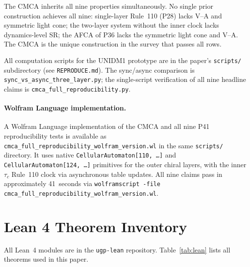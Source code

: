 \documentclass[11pt]{article}
\theoremstyle{remark}
\newcommand{\lean}[1]{%
  \penalty-100
  \begingroup\def\_{\textunderscore\allowbreak}\texttt{#1}\endgroup}
\begin{document}
\begin{appendices}
The CMCA inherits all nine properties simultaneously.  No single prior
construction achieves all nine: single-layer Rule~110 (P28) lacks V--A and
symmetric light cone; the two-layer system without the inner clock lacks
dynamics-level SR; the AFCA of P36 lacks the symmetric light cone and V--A.
The CMCA is the unique construction in the survey that passes all rows.

All computation scripts for the UNIDM1 prototype are in the paper's
\texttt{scripts/} subdirectory (see \texttt{REPRODUCE.md}).
The sync/async comparison is \texttt{sync\_vs\_async\_three\_layer.py};
the single-script verification of all nine headline claims is
\texttt{cmca\_full\_reproducibility.py}.

\paragraph{Wolfram Language implementation.}
A Wolfram Language implementation of the CMCA and all nine P41 reproducibility
tests is available as \texttt{cmca\_full\_reproducibility\_wolfram\_version.wl} in the same \texttt{scripts/}
directory.  It uses native \texttt{CellularAutomaton[110,~\ldots]} and
\texttt{CellularAutomaton[124,~\ldots]} primitives for the outer chiral layers,
with the inner $\tau_c$ Rule~110 clock via asynchronous table updates.
All nine claims pass in approximately 41~seconds via
\texttt{wolframscript -file cmca\_full\_reproducibility\_wolfram\_version.wl}.

\section{Lean 4 Theorem Inventory}
\label{app:lean}

All Lean~4 modules are in the \lean{ugp-lean} repository.
Table~\ref{tab:lean} lists all theorems used in this paper.


\end{appendices}
\end{document}
